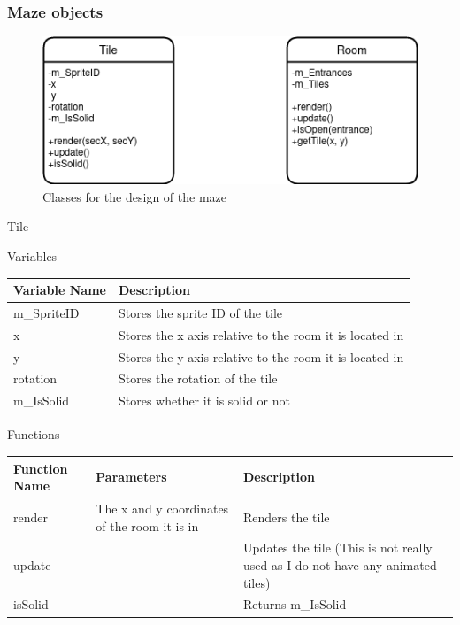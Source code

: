 \documentclass{article}
\begin{document}
            \subsubsection{Maze objects}
                \begin{figure}[hbt!]
                    \centerline{\includegraphics[scale=0.5]{img/Classes/Rooms.png}}
                    \caption{Classes for the design of the maze}
                    \label{fig}
                \end{figure}
                Tile
                \begin{center}
                    Variables
                    \begin{tabular}{ | m{} | m{} | }
                        \hline
                        \textbf{Variable Name} & \textbf{Description} \\
                        \hline
                        m\_SpriteID & Stores the sprite ID of the tile \\
                        \hline
                        x & Stores the x axis relative to the room it is located in \\
                        \hline
                        y & Stores the y axis relative to the room it is located in \\
                        \hline
                        rotation & Stores the rotation of the tile \\
                        \hline
                        m\_IsSolid & Stores whether it is solid or not \\
                        \hline
                    \end{tabular}
                    Functions
                    \begin{tabular}{ | m{} | m{}| m{} | }
                        \hline
                        \textbf{Function Name} & \textbf{Parameters} & \textbf{Description} \\
                        \hline
                        render & The x and y coordinates of the room it is in & Renders the tile \\
                        \hline
                        update & & Updates the tile (This is not really used as I do not have any animated tiles) \\
                        \hline
                        isSolid & & Returns m\_IsSolid \\
                        \hline
                    \end{tabular}
                \end{center}
\end{document}
